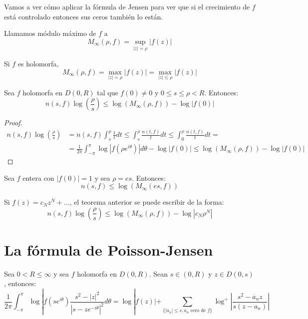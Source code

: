 Vamos a ver cómo aplicar la fórmula de Jensen para ver que si el crecimiento de $f$ está controlado entonces sus ceros también lo están.

\begin{definition}
    Llamamos módulo máximo de $f$ a
    $$M_\infty(\rho, f) = \sup_{|z|=\rho} |f(z)|$$
\end{definition}

\begin{remark}
    Si $f$ es holomorfa,
    $$M_\infty(\rho, f) = \max_{|z|=\rho} |f(z)| = \max_{|z|\leq\rho} |f(z)|$$
\end{remark}

\begin{theorem}
    Sea $f$ holomorfa en $D(0, R)$ tal que $f(0) \neq 0$ y $0 \leq s \leq \rho < R$.
    Entonces:
    $$n(s, f)\log\left(\frac{\rho}{s}\right) \leq \log(M_\infty(\rho, f)) - \log|f(0)|$$
\end{theorem}

\begin{proof}
    \begin{align*}
        n(s, f)\log\left(\frac{\rho}{s}\right) & = n(s, f)\int_s^\rho \frac{1}{t}dt \leq \int_s^\rho \frac{n(t, f)}{t}dt \leq \int_0^\rho \frac{n(t, f)}{t}dt =           \\
                                               & = \frac{1}{2\pi} \int_{-\pi}^\pi \log|f(\rho e^{i\theta})|d\theta - \log|f(0)| \leq \log(M_\infty(\rho, f)) - \log|f(0)|
    \end{align*}
\end{proof}

\begin{example}
    Sea $f$ entera con $|f(0)| = 1$ y sea $\rho = es$.
    Entonces:
    $$n(s, f) \leq \log(M_\infty(es, f))$$
\end{example}

\begin{remark}
    Si $f(z) = c_Nz^N + \dots$, el teorema anterior se puede escribir de la forma:
    $$n(s, f)\log\left(\frac{\rho}{s}\right) \leq \log(M_\infty(\rho, f)) - \log|c_N\rho^N|$$
\end{remark}

\section{La fórmula de Poisson-Jensen}
\begin{theorem}
    Sea $0 < R \leq \infty$ y sea $f$ holomorfa en $D(0, R)$.
    Sean $s \in (0, R)$ y $z \in D(0, s)$, entonces:
    $$\frac{1}{2\pi} \int_{-\pi}^\pi \log|f(se^{i\theta})\frac{s^2-|z|^2}{|s-ze^{-i\theta}|^2}d\theta = \log|f(z)| + \sum_{\{|a_n| \leq s, a_n \text{ cero de } f\}} \log^+\left|\frac{s^2-\overline{a}_nz}{s(z-a_n)}\right|$$
\end{theorem}

